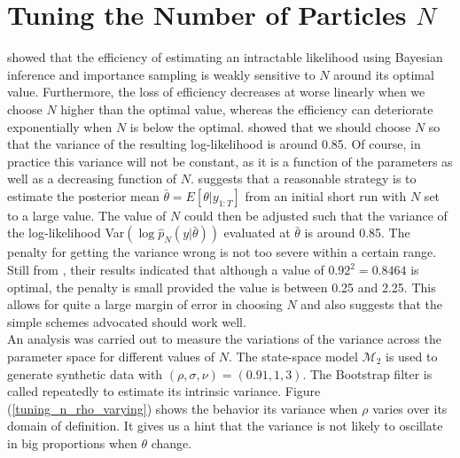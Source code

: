\documentclass[11pt,a4,twosided,singlespacing,titlepagenumber=on]{scrreprt}
\numberwithin{equation}{chapter} %
\theoremstyle{remark}
\begin{document}
\section{Tuning the Number of Particles $N$}
\label{sec:tuning_n}
\cite{tran2014} showed that the efficiency of estimating an intractable likelihood using Bayesian inference and importance sampling is weakly sensitive to $N$ around its optimal value. Furthermore, the loss of efficiency decreases at worse linearly when we choose $N$ higher than the optimal value, whereas
the efficiency can deteriorate exponentially when $N$ is below the optimal. \cite{pitt2012} showed that we should choose $N$ so that the variance of the resulting log-likelihood is around 0.85. Of course, in practice this variance will not be constant, as it is a function of the parameters as well as a decreasing function of $N$. \cite{pitt2012} suggests that a reasonable strategy is to estimate the posterior mean $\bar{\theta} = E[\theta|y_{1:T}]$ from an initial short run with $N$ set to a large value. The value of $N$ could then be adjusted such that the variance of the log-likelihood Var$(\log \hat{p}_N(y|\bar{\theta}))$ evaluated at $\bar{\theta}$ is around 0.85. The penalty for getting the variance wrong is not too severe within a certain range. Still from \cite{pitt2012}, their results indicated that although a value of $0.92^2 = 0.8464$ is optimal, the penalty is small provided the value is between 0.25 and 2.25. This allows for quite a large margin of error in choosing $N$ and also suggests that the simple schemes advocated should work well. \\

An analysis was carried out to measure the variations of the variance across the parameter space for different values of $N$. The state-space model $\mathcal{M}_2$ is used to generate synthetic data with $(\rho,\sigma,\nu) = (0.91,1,3)$. The Bootstrap filter is called repeatedly to estimate its intrinsic variance. Figure (\ref{tuning_n_rho_varying}) shows the behavior its variance when $\rho$ varies over its domain of definition. It gives us a hint that the variance is not likely to oscillate in big proportions when $\theta$ change. \\
\end{document}
